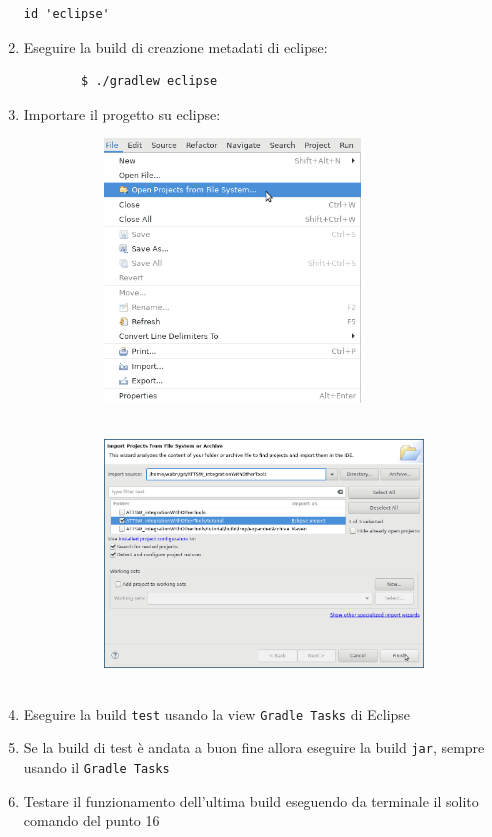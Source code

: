 \begin{enumerate}
\begin{lstlisting}[frame=single]
    id 'eclipse'
    \end{lstlisting}
    \item Eseguire la build di creazione metadati di eclipse:
    \begin{verbatim}
        $ ./gradlew eclipse \end{verbatim}
    \item Importare il progetto su eclipse:
    \begin{figure}[H]
        \begin{subfigure}{0.5\textwidth}
        \includegraphics[width=1.0\linewidth, height=7cm]{3DependencyManagement/eclipsePlugin/openProject.png}
        \end{subfigure}
        \begin{subfigure}{0.5\textwidth}
        \includegraphics[width=1.0\linewidth, height=7cm]{3DependencyManagement/tutorial/importSource.png}
        \end{subfigure}
    \end{figure}
    \item Eseguire la build \texttt{test} usando la view \texttt{Gradle Tasks} di Eclipse
    \item Se la build di test è andata a buon fine allora eseguire la build \texttt{jar}, sempre usando il \texttt{Gradle Tasks}
    \item Testare il funzionamento dell'ultima build eseguendo da terminale il solito comando del punto 16
\end{enumerate}